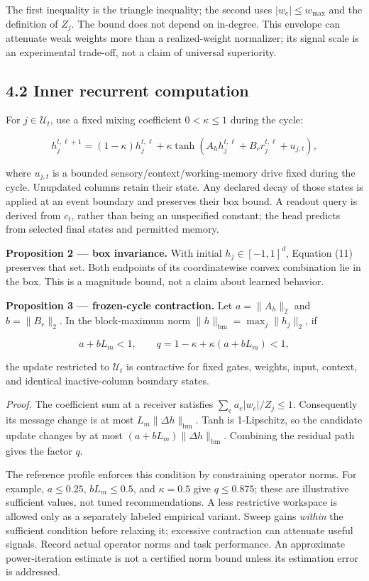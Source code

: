 \documentclass[
  11pt,
  a4paper,
]{article}
\begin{document}
The first inequality is the triangle inequality; the second uses
\(|w_e|\le w_{\max}\) and the definition of \(Z_j\). The bound does not
depend on in-degree. This envelope can attenuate weak weights more than
a realized-weight normalizer; its signal scale is an experimental
trade-off, not a claim of universal superiority.

\subsection{4.2 Inner recurrent
computation}\label{inner-recurrent-computation}

For \(j\in\mathcal U_t\), use a fixed mixing coefficient
\(0<\kappa\le1\) during the cycle:

\[
h_j^{t,\ell+1}
=(1-\kappa)h_j^{t,\ell}
+\kappa\tanh(A_hh_j^{t,\ell}+B_rr_j^{t,\ell}+u_{j,t}),
\tag{11}
\]

where \(u_{j,t}\) is a bounded sensory/context/working-memory drive
fixed during the cycle. Unupdated columns retain their state. Any
declared decay of those states is applied at an event boundary and
preserves their box bound. A readout query is derived from \(c_t\),
rather than being an unspecified constant; the head predicts from
selected final states and permitted memory.

\textbf{Proposition 2 --- box invariance.} With initial
\(h_j\in[-1,1]^d\), Equation (11) preserves that set. Both endpoints of
its coordinatewise convex combination lie in the box. This is a
magnitude bound, not a claim about learned behavior.

\textbf{Proposition 3 --- frozen-cycle contraction.} Let \(a=\|A_h\|_2\)
and \(b=\|B_r\|_2\). In the block-maximum norm
\(\|h\|_{\mathrm{bm}}=\max_j\|h_j\|_2\), if

\[
a+bL_m<1,
\qquad q=1-\kappa+\kappa(a+bL_m)<1,
\tag{12}
\]

the update restricted to \(\mathcal U_t\) is contractive for fixed
gates, weights, input, context, and identical inactive-column boundary
states.

\emph{Proof.} The coefficient sum at a receiver satisfies
\(\sum_e a_e|w_e|/Z_j\le1\). Consequently its message change is at most
\(L_m\|\Delta h\|_{\mathrm{bm}}\). Tanh is 1-Lipschitz, so the candidate
update changes by at most \((a+bL_m)\|\Delta h\|_{\mathrm{bm}}\).
Combining the residual path gives the factor \(q\).

The reference profile enforces this condition by constraining operator
norms. For example, \(a\le0.25\), \(bL_m\le0.5\), and \(\kappa=0.5\)
give \(q\le0.875\); these are illustrative sufficient values, not tuned
recommendations. A less restrictive workspace is allowed only as a
separately labeled empirical variant. Sweep gains \emph{within} the
sufficient condition before relaxing it; excessive contraction can
attenuate useful signals. Record actual operator norms and task
performance. An approximate power-iteration estimate is not a certified
norm bound unless its estimation error is addressed.
\end{document}
